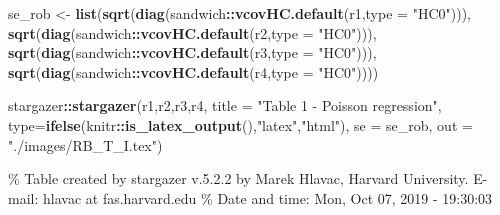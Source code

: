 \documentclass[]{book}
\newenvironment{Shaded}{\begin{snugshade}}{\end{snugshade}}
\newcommand{\KeywordTok}[1]{\textcolor[rgb]{0.13,0.29,0.53}{\textbf{#1}}}
\newcommand{\DataTypeTok}[1]{\textcolor[rgb]{0.13,0.29,0.53}{#1}}
\newcommand{\StringTok}[1]{\textcolor[rgb]{0.31,0.60,0.02}{#1}}
\newcommand{\OperatorTok}[1]{\textcolor[rgb]{0.81,0.36,0.00}{\textbf{#1}}}
\newcommand{\NormalTok}[1]{#1}
\begin{document}
\begin{Shaded}
\begin{Highlighting}[]
\NormalTok{se_rob <-}\StringTok{ }\KeywordTok{list}\NormalTok{(}\KeywordTok{sqrt}\NormalTok{(}\KeywordTok{diag}\NormalTok{(sandwich}\OperatorTok{::}\KeywordTok{vcovHC.default}\NormalTok{(r1,}\DataTypeTok{type =} \StringTok{"HC0"}\NormalTok{))),}
               \KeywordTok{sqrt}\NormalTok{(}\KeywordTok{diag}\NormalTok{(sandwich}\OperatorTok{::}\KeywordTok{vcovHC.default}\NormalTok{(r2,}\DataTypeTok{type =} \StringTok{"HC0"}\NormalTok{))),}
               \KeywordTok{sqrt}\NormalTok{(}\KeywordTok{diag}\NormalTok{(sandwich}\OperatorTok{::}\KeywordTok{vcovHC.default}\NormalTok{(r3,}\DataTypeTok{type =} \StringTok{"HC0"}\NormalTok{))),}
               \KeywordTok{sqrt}\NormalTok{(}\KeywordTok{diag}\NormalTok{(sandwich}\OperatorTok{::}\KeywordTok{vcovHC.default}\NormalTok{(r4,}\DataTypeTok{type =} \StringTok{"HC0"}\NormalTok{))))}
\end{Highlighting}
\end{Shaded}

\begin{Shaded}
\begin{Highlighting}[]
\NormalTok{stargazer}\OperatorTok{::}\KeywordTok{stargazer}\NormalTok{(r1,r2,r3,r4, }\DataTypeTok{title =} \StringTok{"Table 1 - Poisson regression"}\NormalTok{, }
          \DataTypeTok{type=}\KeywordTok{ifelse}\NormalTok{(knitr}\OperatorTok{::}\KeywordTok{is_latex_output}\NormalTok{(),}\StringTok{"latex"}\NormalTok{,}\StringTok{"html"}\NormalTok{), }\DataTypeTok{se =}\NormalTok{ se_rob, }\DataTypeTok{out =} \StringTok{"./images/RB_T_I.tex"}\NormalTok{)}
\end{Highlighting}
\end{Shaded}

\% Table created by stargazer v.5.2.2 by Marek Hlavac, Harvard
University. E-mail: hlavac at fas.harvard.edu \% Date and time: Mon, Oct
07, 2019 - 19:30:03
\end{document}
